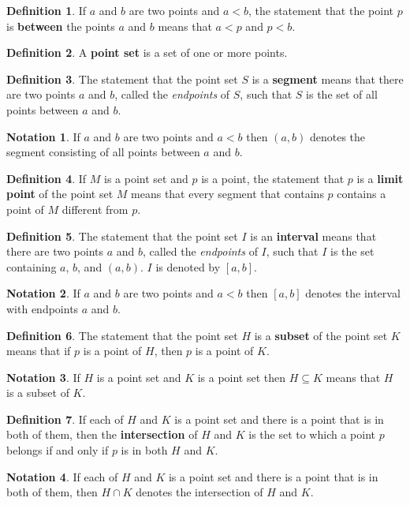 \documentclass{article}
\theoremstyle{definition}
\newtheorem{definition}{Definition}
\newtheorem{notation}{Notation}
\begin{document}
\begin{definition}
If $a$ and $b$ are two points and $a < b$, the statement that the point $p$ is \textbf{between} the points $a$ and $b$ means that $a < p$ and $p < b$.
\end{definition}

\begin{definition}
A \textbf{point set} is a set of one or more points.
\end{definition}

\begin{definition}
The statement that the point set $S$ is a \textbf{segment} means that there are two points $a$ and $b$, called the \textit{endpoints} of $S$, such that $S$ is the set of all points between $a$ and $b$. 
\end{definition}

\begin{notation}
If $a$ and $b$ are two points and $a < b$ then $(a, b)$ denotes the segment consisting of all points between $a$ and $b$.
\end{notation}
\begin{definition}
If $M$ is a point set and $p$ is a point, the statement that $p$ is a \textbf{limit point} of the point set $M$ means that every segment that contains $p$ contains a point of $M$ different from $p$.
\end{definition}

\begin{definition}
The statement that the point set $I$ is an \textbf{interval} means that there are two points $a$ and $b$, called the \textit{endpoints} of $I$, such that $I$ is the set containing $a$, $b$, and $(a, b)$. $I$ is denoted by $[a, b]$.
\end{definition}
\begin{notation}
If $a$ and $b$ are two points and $a < b$ then $[a, b]$ denotes the interval with endpoints $a$ and $b$.
\end{notation}

\begin{definition}
The statement that the point set $H$ is a \textbf{subset} of the point set $K$ means that if $p$ is a point of $H$, then $p$ is a point of $K$. 
\end{definition}
\begin{notation}
If $H$ is a point set and $K$ is a point set then $H \subseteq K$ means that $H$ is a subset of $K$.
\end{notation}

\begin{definition}
If each of $H$ and $K$ is a point set and there is a point that is in both of them, then the \textbf{intersection} of $H$ and $K$ is the set to which a point $p$ belongs if and only if $p$ is in both $H$ and $K$.
\end{definition}
\begin{notation}
If each of $H$ and $K$ is a point set and there is a point that is in both of them, then $H \cap K$ denotes the intersection of $H$ and $K$.
\end{notation}
\end{document}
